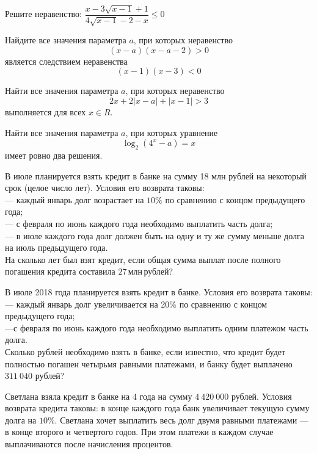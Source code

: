 %
%

\begin{class}[number=1]
	\begin{listofex}
		\item Решите неравенство: \(  \dfrac{x-3\sqrt{x-1}+1}{4\sqrt{x-1}-2-x}\le0 \)
		\item Найдите все значения параметра \( a \), при которых неравенство
		\[ (x-a)(x-a-2)>0 \]
		является следствием неравенства
		\[ (x-1)(x-3)<0 \]
		\item Найти все значения параметра \( a \), при которых неравенство
		\[ 2x+2|x-a|+|x-1| > 3 \]
		выполняется для всех \( x\in R \).
		\item Найти все значения параметра \( a \), при которых уравнение
		\[ \log_2(4^x-a)=x \]
		имеет ровно два решения.
		\item В июле планируется взять кредит в банке на сумму 18 млн рублей на некоторый срок (целое число лет).
		Условия его возврата таковы:\\
		--- каждый январь долг возрастает на \( 10\% \) по сравнению с концом предыдущего года;\\
		--- с февраля по июнь каждого года необходимо выплатить часть долга;\\
		--- в июле каждого года долг должен быть на одну и ту же сумму меньше долга на июль предыдущего года.\\
		На сколько лет был взят кредит, если общая сумма выплат после полного погашения кредита составила \( 27 \) млн рублей?
		\item В июле 2018 года планируется взять кредит в банке. Условия его возврата таковы:\\
		--- каждый январь долг увеличивается на 20\% по сравнению с концом предыдущего года;\\
		---с февраля по июнь каждого года необходимо выплатить одним платежом часть долга.\\
		Сколько рублей необходимо взять в банке, если известно,
		что кредит будет полностью погашен четырьмя равными платежами,
		и банку будет выплачено \( 311\:040 \) рублей?
		\item Светлана взяла кредит в банке на 4 года на сумму \( 4\:420\:000 \) рублей.
		Условия возврата кредита таковы: в конце каждого года банк увеличивает текущую сумму долга на \( 10\% \).
		Светлана хочет выплатить весь долг двумя равными платежами --- в конце второго и четвертого годов.
		При этом платежи в каждом случае выплачиваются после начисления процентов.

\end{listofex}
\end{class}
